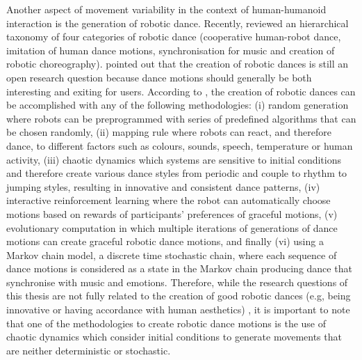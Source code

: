 Another aspect of movement variability in the context of human-humanoid 
interaction is the generation of robotic dance.
Recently, \cite{peng2015} reviewed an hierarchical taxonomy of 
four categories of robotic dance (cooperative human-robot dance, 
imitation of human dance motions, synchronisation for music and 
creation of robotic choreography).
\cite{peng2015} pointed out that the creation of robotic dances is still 
an open research question because dance motions should generally be both 
interesting and exiting for users. 
According to \cite{peng2015}, the creation of robotic dances can be 
accomplished with any of the following methodologies:
(i) random generation where robots can be 
preprogrammed with series of predefined algorithms that can be chosen randomly,
(ii) mapping rule where robots can react, and therefore dance, to different 
factors such as colours, sounds, speech, temperature or human activity,
(iii) chaotic dynamics which systems are sensitive to initial conditions and 
therefore create various dance styles from periodic and couple to rhythm to 
jumping styles, resulting in innovative and consistent dance patterns,
(iv) interactive reinforcement learning where the robot can automatically 
choose motions based on rewards of participants' 
preferences of graceful motions,
(v) evolutionary computation in which multiple iterations of generations
of dance motions can create graceful robotic dance motions, and
finally (vi) using a Markov chain model, a discrete time stochastic chain, 
where each sequence of dance motions is considered as a state in the Markov 
chain producing dance that synchronise with music and emotions.
Therefore, while the research questions of this thesis are not fully related 
to the creation of good robotic dances (e.g, being innovative or having 
accordance with human aesthetics) \citep{peng2015}, it is important to note 
that one of the methodologies to create robotic dance motions is the use of 
chaotic dynamics
which consider initial conditions to generate movements 
that are neither deterministic or stochastic.


